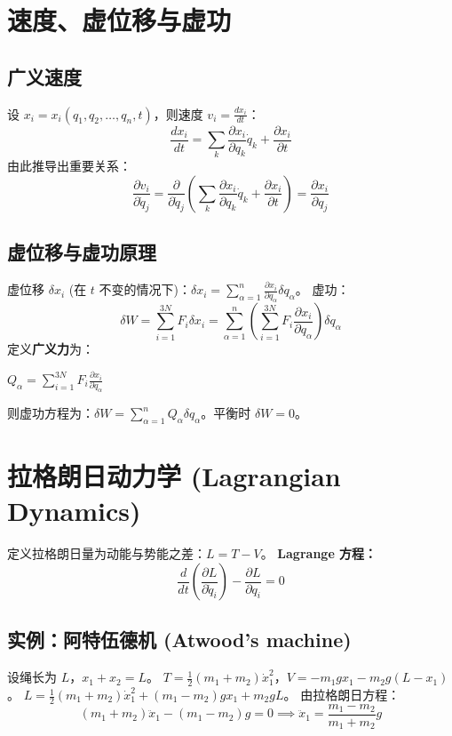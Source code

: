 \documentclass[11pt,a4paper]{article}
\begin{document}
\section{速度、虚位移与虚功}

\subsection{广义速度}
设 $x_i = x_i(q_1, q_2, \dots, q_n, t)$，则速度 $v_i = \frac{dx_i}{dt}$：
$$ \frac{dx_i}{dt} = \sum_{k} \frac{\partial x_i}{\partial q_k} \dot{q}_k + \frac{\partial x_i}{\partial t} $$
由此推导出重要关系：
$$ \frac{\partial v_i}{\partial \dot{q}_j} = \frac{\partial}{\partial \dot{q}_j} \left( \sum_k \frac{\partial x_i}{\partial q_k} \dot{q}_k + \frac{\partial x_i}{\partial t} \right) = \frac{\partial x_i}{\partial q_j} $$

\subsection{虚位移与虚功原理}
虚位移 $\delta x_i$ (在 $t$ 不变的情况下)：$\delta x_i = \sum_{\alpha=1}^{n} \frac{\partial x_i}{\partial q_\alpha} \delta q_\alpha$。
虚功：
$$ \delta W = \sum_{i=1}^{3N} F_i \delta x_i = \sum_{\alpha=1}^n \left( \sum_{i=1}^{3N} F_i \frac{\partial x_i}{\partial q_\alpha} \right) \delta q_\alpha $$
定义\textbf{广义力}为：
\begin{tcolorbox}[colframe=red!50!black, colback=white, title=定义]
    $Q_\alpha = \sum_{i=1}^{3N} F_i \frac{\partial x_i}{\partial q_\alpha}$
\end{tcolorbox}
则虚功方程为：$\delta W = \sum_{\alpha=1}^n Q_\alpha \delta q_\alpha$。平衡时 $\delta W = 0$。

\section{拉格朗日动力学 (Lagrangian Dynamics)}

定义拉格朗日量为动能与势能之差：$\boxed{L = T - V}$。
\textbf{Lagrange 方程：}
$$ \boxed{\frac{d}{dt} \left( \frac{\partial L}{\partial \dot{q}_i} \right) - \frac{\partial L}{\partial q_i} = 0} $$

\subsection{实例：阿特伍德机 (Atwood's machine)}

设绳长为 $L$，$x_1 + x_2 = L$。
$T = \frac{1}{2}(m_1 + m_2)\dot{x}_1^2$，$V = -m_1 g x_1 - m_2 g (L - x_1)$。
$L = \frac{1}{2}(m_1+m_2)\dot{x}_1^2 + (m_1-m_2)g x_1 + m_2 g L$。
由拉格朗日方程：
$$ (m_1+m_2)\ddot{x}_1 - (m_1-m_2)g = 0 \implies \ddot{x}_1 = \frac{m_1-m_2}{m_1+m_2}g $$
\end{document}
